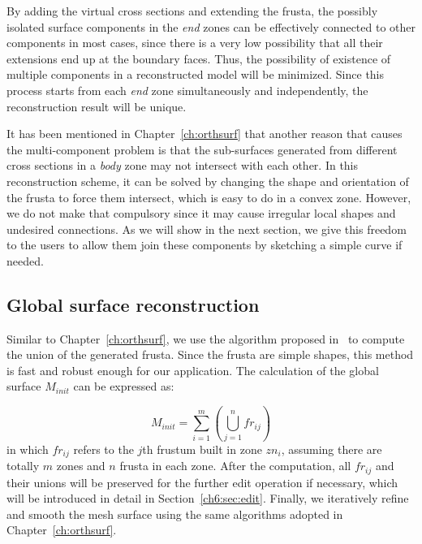 By adding the  virtual cross sections and extending the frusta, the
possibly isolated surface components in the \textit{end} zones can
be effectively connected to other components in most cases, since
there is a very low possibility that all their extensions end up at
the boundary faces. Thus, the possibility of existence of multiple
components in a reconstructed model will be minimized. Since this
process starts from each \textit{end} zone simultaneously and
independently, the reconstruction result will be unique.

It has been mentioned  in Chapter~\ref{ch:orthsurf} that another
reason that causes the multi-component problem is that the
sub-surfaces generated from different cross sections in a
\textit{body} zone may not intersect with each other. In this
reconstruction scheme, it can be solved by changing the shape and
orientation of the frusta to force them intersect, which is easy to
do in a convex zone. However, we do not make that compulsory since
it may cause irregular local shapes and undesired connections. As we
will show in the next section, we give this freedom to the users to
allow them join these components by sketching a simple curve if
needed.



\subsection{Global surface reconstruction}
\label{ch6:sec:reconst:global}

Similar to Chapter~\ref{ch:orthsurf},  we use the algorithm proposed
in~\cite{LTH86} to compute the union of the generated frusta. Since
the frusta are simple shapes, this method is fast and robust enough
for our application. The calculation of the global surface
$M_{init}$ can be expressed as:

\begin{equation}
\label{eq:surfreconst}
    M_{init}=\sum\limits_{i=1}^m {(\bigcup\limits_{j = 1}^n {fr_{ij}})}
\end{equation}
in which $fr_{ij}$ refers to the  $j$th frustum built in zone
$zn_i$, assuming there are totally $m$ zones and $n$ frusta in each
zone. After the computation, all $fr_{ij}$ and their unions will
be preserved for the further edit operation if necessary, which will
be introduced in detail in Section~\ref{ch6:sec:edit}. Finally, we
iteratively refine and smooth the mesh surface using the same
algorithms adopted in Chapter~\ref{ch:orthsurf}.

